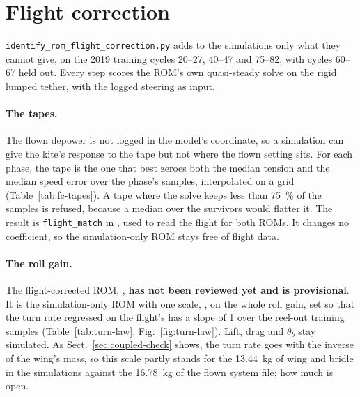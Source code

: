 \documentclass[11pt,a4paper]{article}
\newcommand{\code}[1]{\texttt{\small #1}}
\begin{document}
\section{Flight correction}
\label{sec:flight-correction}
\code{identify\_rom\_flight\_correction.py} adds to the simulations only what they cannot
give, on the 2019 training cycles 20--27, 40--47 and 75--82, with cycles 60--67 held out.
Every step scores the ROM's own quasi-steady solve on the rigid lumped tether, with the
logged steering as input.

\paragraph{The tapes.}
The flown depower is not logged in the model's coordinate, so a simulation can give the
kite's response to the tape but not where the flown setting sits. For each phase, the tape
is the one that best zeroes both the median tension and the median speed error over the
phase's samples, interpolated on a grid (Table~\ref{tab:fc-tapes}). A tape where the solve
keeps less than \SI{75}{\percent} of the samples is refused, because a median over the
survivors would flatter it. The result is \code{flight\_match} in
, used to read the flight for both ROMs. It changes no coefficient,
so the simulation-only ROM stays free of flight data.

\begin{table}[H]
\centering\small
\caption{The tape grid on the training cycles: median errors and the share of samples
solved. Reel-out and reel-in tapes move together in one run. Selected:
\SI{\matchOut}{\metre} and \SI{\matchIn}{\metre}.}
\label{tab:fc-tapes}

\end{table}

\paragraph{The roll gain.}
The flight-corrected ROM, ,
\textbf{has not been reviewed yet and is provisional}. It is the simulation-only ROM with one
scale, \gainScale{}, on the whole roll gain, set so that the turn rate regressed on the
flight's has a slope of 1 over the reel-out training samples
(Table~\ref{tab:turn-law}, Fig.~\ref{fig:turn-law}). Lift, drag and $\theta_b$ stay simulated. As
Sect.~\ref{sec:coupled-check} shows, the turn rate goes with the inverse of the wing's mass,
so this scale partly stands for the \SI{13.44}{\kilogram} of wing and bridle in the
simulations against the \SI{16.78}{\kilogram} of the flown system file; how much is open.
\end{document}
